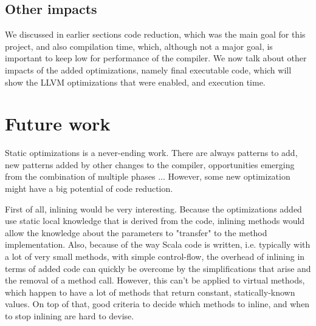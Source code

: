 \documentclass[12pt,a4paper]{article}
\begin{document}
\subsection{Other impacts}

We discussed in earlier sections code reduction, which was the main goal for this project, and also compilation time, which, although not a major goal, is important to keep low for performance of the compiler. We now talk about other impacts of the added optimizations, namely final executable code, which will show the LLVM optimizations that were enabled, and execution time.




\section{Future work}

Static optimizations is a never-ending work. There are always patterns to add, new patterns added by other changes to the compiler, opportunities emerging from the combination of multiple phases ... However, some new optimization might have a big potential of code reduction.

First of all, inlining would be very interesting. Because the optimizations added use static local knowledge that is derived from the code, inlining methods would allow the knowledge about the parameters to "transfer" to the method implementation. Also, because of the way Scala code is written, i.e. typically with a lot of very small methods, with simple control-flow, the overhead of inlining in terms of added code can quickly be overcome	 by the simplifications that arise and the removal of a method call. However, this can't be applied to virtual methods, which happen to have a lot of methods that return constant, statically-known values. On top of that, good criteria to decide which methods to inline, and when to stop inlining are hard to devise.
\end{document}
